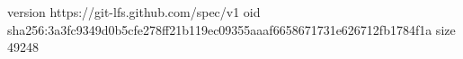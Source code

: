 version https://git-lfs.github.com/spec/v1
oid sha256:3a3fc9349d0b5cfe278ff21b119ec09355aaaf6658671731e626712fb1784f1a
size 49248
